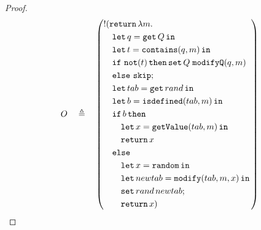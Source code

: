 \begin{proof}
\small{
\begin{align}
    O \quad\triangleq\quad \left( 
    \begin{aligned}
        &\mathord{!}(\mathtt{return}\, \lambda m. \\
        &\quad \mathtt{let}\,q=\mathtt{get}\, Q\,\mathtt{in}\, \\
        &\quad \mathtt{let}\,t=\mathtt{contains}(q,m)\,\mathtt{in}\, \\
        &\quad \mathtt{if}\ \mathtt{not}(t)\,\mathtt{then} \, \mathtt{set}\,Q\;\mathtt{modifyQ}(q,m) \\
        &\quad \mathtt{else}\ \mathtt{skip}; \\
        &\quad\mathtt{let}\,tab = \mathtt{get}\,rand\,\mathtt{in}\, \\
        &\quad\mathtt{let}\,b = \mathtt{isdefined}(tab, m)\,\mathtt{in}\, \\
        &\quad\mathtt{if}\, b\, \mathtt{then} \\
        &\quad\quad \mathtt{let}\,x = \mathtt{getValue}(tab, m)\,\mathtt{in}\, \\
        &\quad\quad \mathtt{return}\, x \\
        &\quad\mathtt{else} \\
        &\quad\quad \mathtt{let}\,x = \mathtt{random}\,\mathtt{in}\, \\
        &\quad\quad \mathtt{let}\,newtab = \mathtt{modify}(tab, m, x)\,\mathtt{in}\, \\
        &\quad\quad \mathtt{set}\,rand\,newtab; \\
        &\quad\quad \mathtt{return}\, x)
    \end{aligned}
    \right) \label{eq:oracle-compacted}  
\end{align}
}


\end{proof}
